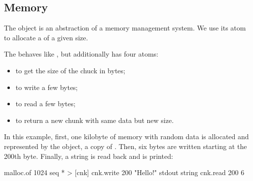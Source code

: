 
\subsection{Memory}\label{sec:memory}

The  object is an abstraction of a memory management system.
We use its  atom to allocate a  of a given size.

The  behaves like , but additionally has four atoms:

\begin{itemize}
  \item {} to get the size of the chuck in bytes;
  \item {} to write a few bytes;
  \item {} to read a few bytes;
  \item {} to return a new chunk with same data but new size.
\end{itemize}

In this example, first, one kilobyte of memory with random data is allocated
  and represented by the  object, a copy of .
Then, six bytes are written starting at the 200th byte.
Finally, a string is read back and  is printed:

\begin{ffcode}
malloc.of
  1024
  seq * > [cnk]
    cnk.write 200 "Hello!"
    stdout
      string
        cnk.read 200 6
\end{ffcode}

